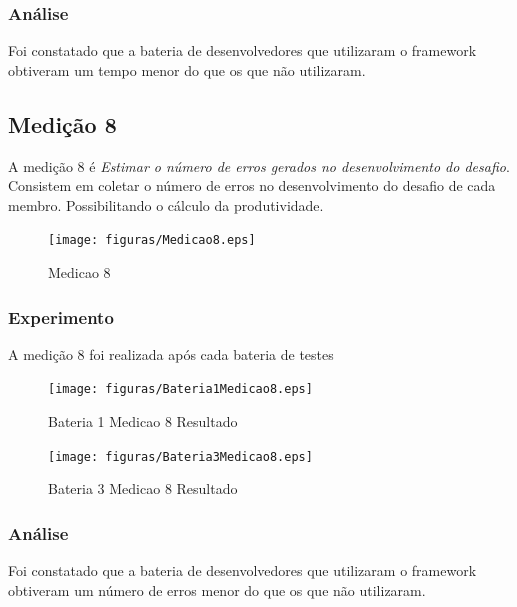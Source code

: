 \subsubsection{Análise}

Foi constatado que a bateria de desenvolvedores que utilizaram o framework obtiveram um tempo menor do que os que não utilizaram.


\subsection{Medição 8}

A medição 8 é \textit{Estimar o número de erros gerados no desenvolvimento do desafio}. Consistem em
coletar o número de erros no desenvolvimento do desafio de cada membro. Possibilitando o cálculo da produtividade.

\begin{figure}[H]
  \centering
  \label{fig:indicadores}
  \texttt{[image: figuras/Medicao8.eps]}
  \caption{Medicao 8}
\end{figure}

\subsubsection{Experimento}

A medição 8 foi realizada após cada bateria de testes


\begin{figure}[H]
  \centering
  \label{fig:indicadores}
  \texttt{[image: figuras/Bateria1Medicao8.eps]}
  \caption{Bateria 1 Medicao 8 Resultado}
\end{figure}


\begin{figure}[H]
  \centering
  \label{fig:indicadores}
  \texttt{[image: figuras/Bateria3Medicao8.eps]}
  \caption{Bateria 3 Medicao 8 Resultado}
\end{figure}



\subsubsection{Análise}

Foi constatado que a bateria de desenvolvedores que utilizaram o framework obtiveram um número de erros menor do que os que não utilizaram.



